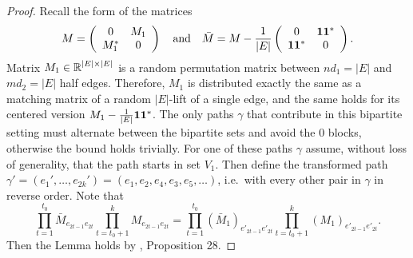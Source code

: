 \begin{proof}
Recall the form of the matrices
\begin{equation*}
    M = 
    \left(
    \begin{array}{cc} 
        0 & M_1 \\
        M_1^* & 0 
    \end{array}
    \right )
    \quad \mbox{and} \quad
    \bar{M} = M - 
    \frac{1}{|E|} \left(
    \begin{array}{cc} 
        0 & \mathbf{1} \mathbf{1}^* \\
        \mathbf{1} \mathbf{1}^* & 0 
    \end{array}
    \right ).
\end{equation*}
Matrix $M_1 \in \operatorname{\mathbb{R}}^{|E| \times |E|}$ is a random permutation matrix between 
$n d_1 = |E|$ and $m d_2 = |E|$ half edges.
Therefore, $M_1$ is distributed exactly the same as a matching matrix
of a random $|E|$-lift of a single edge,
and the same holds for its centered version $M_1 - \frac{1}{|E|} \mathbf{1} \mathbf{1}^*$.
The only paths $\gamma$ that contribute in this bipartite setting must alternate
between the bipartite sets and avoid the 0 blocks,
otherwise the bound holds trivially.
For one of these paths $\gamma$
assume, without loss of generality, that the path starts in set $V_1$.
Then define the transformed path 
$\gamma' = (e_1', \ldots, e_{2k}') = (e_1, e_2, e_4, e_3, e_5, \ldots)$,
i.e.\ with every other pair in $\gamma$ in reverse order.
Note that
\begin{equation}
\prod_{t=1}^{t_0} \bar{M}_{e_{2t - 1} e_{2t}}
\prod_{t=t_0+1}^{k} M_{e_{2t - 1} e_{2t}}
=
\prod_{t=1}^{t_0} (\bar{M}_1)_{e'_{2t - 1} e'_{2t}}
\prod_{t=t_0+1}^{k} (M_1)_{e'_{2t - 1} e'_{2t}} .
\end{equation}
Then the Lemma holds by
\cite{bordenave2015}, Proposition 28.
\end{proof}


